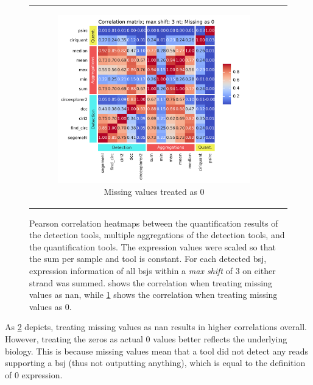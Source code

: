\begin{figure}[ht]
\begin{tabular}{cc}
\begin{subfigure}{0.5\textwidth}
            \includegraphics[width=\linewidth]{chapters/4_results_and_discussion/figures/quantification/correlation_heatmap_3_0.png}
            \caption{Missing values treated as 0}
            \label{fig:correlation_heatmap_3_0}
        \end{subfigure} \end{tabular} \caption{Pearson correlation heatmaps
        between the quantification results of the detection tools, multiple
        aggregations of the detection tools, and the quantification tools.
        The expression values were scaled so that the sum per sample and tool is
        constant.
        For each detected \gls{bsj}, expression information of all \glspl{bsj} within a
        \textit{max shift} of 3 on either strand was summed.
         shows the correlation when treating
        missing values as \gls{nan}, while \cref{fig:correlation_heatmap_3_0}
        shows the correlation when treating missing values as 0.
    } \label{fig:correlation_heatmap} \end{figure}

As \cref{fig:correlation_heatmap} depicts, treating missing values as \gls{nan}
results in higher correlations overall.
However, treating the zeros as actual 0 values better reflects the underlying
biology.
This is because missing values mean that a tool did not detect any reads
supporting a \gls{bsj} (thus not outputting anything), which is equal to the
definition of 0 expression.

